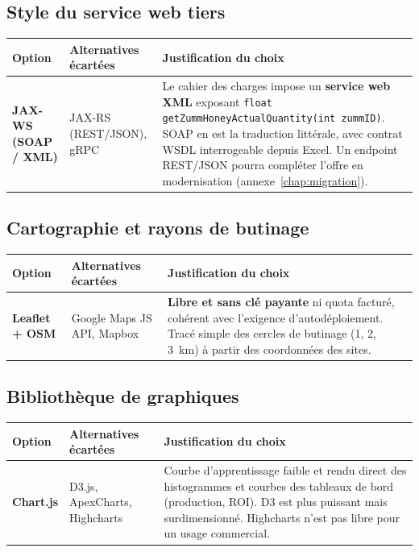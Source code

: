 \subsection{Style du service web tiers}
\begin{xltabular}{\textwidth}{>{\bfseries}p{2.7cm} p{4.2cm} X}
\toprule
\textbf{Option} & \textbf{Alternatives écartées} & \textbf{Justification du choix} \\
\midrule
\endhead
JAX-WS (SOAP / XML) & JAX-RS (REST/JSON), gRPC & Le cahier des charges impose un \textbf{service web XML} exposant \texttt{float getZummHoneyActualQuantity(int zummID)}. SOAP en est la traduction littérale, avec contrat WSDL interrogeable depuis Excel. Un endpoint REST/JSON pourra compléter l'offre en modernisation (annexe~\ref{chap:migration}). \\
\bottomrule
\end{xltabular}

\subsection{Cartographie et rayons de butinage}
\begin{xltabular}{\textwidth}{>{\bfseries}p{2.7cm} p{4.2cm} X}
\toprule
\textbf{Option} & \textbf{Alternatives écartées} & \textbf{Justification du choix} \\
\midrule
\endhead
Leaflet + OSM & Google Maps JS API, Mapbox & \textbf{Libre et sans clé payante} ni quota facturé, cohérent avec l'exigence d'autodéploiement. Tracé simple des cercles de butinage (1, 2, 3~km) à partir des coordonnées des sites. \\
\bottomrule
\end{xltabular}

\subsection{Bibliothèque de graphiques}
\begin{xltabular}{\textwidth}{>{\bfseries}p{2.7cm} p{4.2cm} X}
\toprule
\textbf{Option} & \textbf{Alternatives écartées} & \textbf{Justification du choix} \\
\midrule
\endhead
Chart.js & D3.js, ApexCharts, Highcharts & Courbe d'apprentissage faible et rendu direct des histogrammes et courbes des tableaux de bord (production, ROI). D3 est plus puissant mais surdimensionné. Highcharts n'est pas libre pour un usage commercial. \\
\bottomrule
\end{xltabular}

